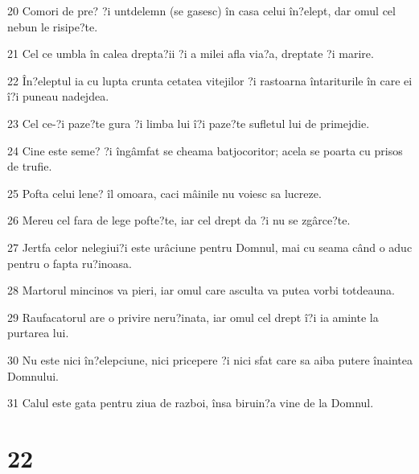 \par 20 Comori de pre? ?i untdelemn (se gasesc) în casa celui în?elept, dar omul cel nebun le risipe?te.
\par 21 Cel ce umbla în calea drepta?ii ?i a milei afla via?a, dreptate ?i marire.
\par 22 În?eleptul ia cu lupta crunta cetatea vitejilor ?i rastoarna întariturile în care ei î?i puneau nadejdea.
\par 23 Cel ce-?i paze?te gura ?i limba lui î?i paze?te sufletul lui de primejdie.
\par 24 Cine este seme? ?i îngâmfat se cheama batjocoritor; acela se poarta cu prisos de trufie.
\par 25 Pofta celui lene? îl omoara, caci mâinile nu voiesc sa lucreze.
\par 26 Mereu cel fara de lege pofte?te, iar cel drept da ?i nu se zgârce?te.
\par 27 Jertfa celor nelegiui?i este urâciune pentru Domnul, mai cu seama când o aduc pentru o fapta ru?inoasa.
\par 28 Martorul mincinos va pieri, iar omul care asculta va putea vorbi totdeauna.
\par 29 Raufacatorul are o privire neru?inata, iar omul cel drept î?i ia aminte la purtarea lui.
\par 30 Nu este nici în?elepciune, nici pricepere ?i nici sfat care sa aiba putere înaintea Domnului.
\par 31 Calul este gata pentru ziua de razboi, însa biruin?a vine de la Domnul.

\chapter{22}

